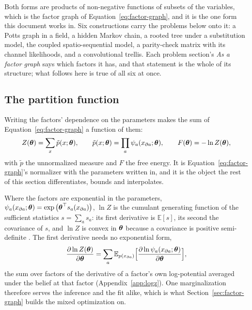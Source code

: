 \documentclass[11pt,a4paper]{article}
\begin{document}
Both forms are products of non-negative functions of subsets of the variables,
which is the factor graph of Equation~\ref{eq:factor-graph}, and it is the one
form this document works in. Six constructions carry the problems below onto
it: a Potts graph in a field, a hidden Markov chain, a rooted tree under a
substitution model, the coupled spatio-sequential model, a parity-check matrix
with its channel likelihoods, and a convolutional trellis. Each problem
section's \emph{As a factor graph} says which factors it has, and that
statement is the whole of its structure; what follows here is true of all six
at once.

\subsection{The partition function}

Writing the factors' dependence on the parameters makes the sum of
Equation~\ref{eq:factor-graph} a function of them:
\begin{equation}
  Z(\boldsymbol{\theta}) = \sum_x \tilde{p}(x; \boldsymbol{\theta}),
  \qquad
  \tilde{p}(x; \boldsymbol{\theta}) = \prod_a \psi_a(x_{\partial a}; \boldsymbol{\theta}),
  \qquad
  F(\boldsymbol{\theta}) = -\ln Z(\boldsymbol{\theta}),
  \label{eq:partition}
\end{equation}
with $\tilde{p}$ the unnormalized measure and $F$ the free energy. It is
Equation~\ref{eq:factor-graph}'s normalizer with the parameters written in, and
it is the object the rest of this section differentiates, bounds and
interpolates.

Where the factors are exponential in the parameters,
$\psi_a(x_{\partial a}; \boldsymbol{\theta})
 = \exp\big(\boldsymbol{\theta}^{\top} s_a(x_{\partial a})\big)$, $\ln Z$ is the cumulant
generating function of the sufficient statistics $s = \sum_a s_a$: its first
derivative is $\mathbb{E}[s]$, its second the covariance of $s$, and $\ln Z$ is
convex in $\boldsymbol{\theta}$ because a covariance is positive semi-definite
\citep{wainwright2008}. The first derivative needs no exponential form,
\begin{equation}
  \frac{\partial \ln Z(\boldsymbol{\theta})}{\partial \boldsymbol{\theta}}
    = \sum_a \mathbb{E}_{p(x_{\partial a})}
      \Big[ \frac{\partial \ln \psi_a(x_{\partial a}; \boldsymbol{\theta})}
                 {\partial \boldsymbol{\theta}} \Big],
  \label{eq:logz-gradient}
\end{equation}
the sum over factors of the derivative of a factor's own log-potential averaged
under the belief at that factor (Appendix~\ref{app:logz}). One marginalization
therefore serves the inference and the fit alike, which is what
Section~\ref{sec:factor-graph} builds the mixed optimization on.
\end{document}
